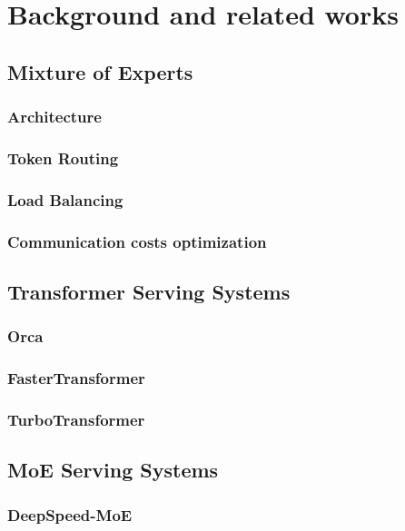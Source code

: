 \chapter{Background and related works}
\section{Mixture of Experts}

\subsection{Architecture}
\subsection{Token Routing}
\subsection{Load Balancing}
\subsection{Communication costs optimization }

\section{Transformer Serving Systems}
\subsection{Orca}
\subsection{FasterTransformer}
\subsection{TurboTransformer}

\section{MoE Serving Systems}
\subsection{DeepSpeed-MoE}